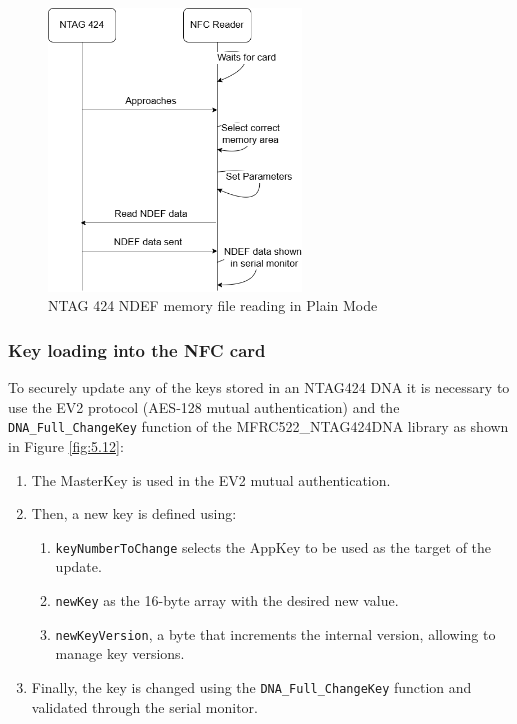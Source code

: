 \begin{figure}[htbp]
	\centering
	\includegraphics[width=0.6\textwidth]{imaxes/NDEF_READ} %
	\caption{NTAG 424 NDEF memory file reading in Plain Mode}
	\label{fig:5.11}
\end{figure}

\subsubsection{Key loading into the NFC card}
\label{subsubsection:keyload}
To securely update any of the keys stored in an NTAG424 DNA it is necessary to use the EV2 protocol (AES-128 mutual authentication) and the \texttt{DNA\_Full\_ChangeKey} function of the MFRC522\_NTAG424DNA library as shown in Figure \ref{fig:5.12}:
\begin{enumerate}
	\item The MasterKey is used in the EV2 mutual authentication.
	\item Then, a new key is defined using:
	\begin{enumerate}
		\item \texttt{keyNumberToChange} selects the AppKey to be used as the target of the update.
		\item \texttt{newKey} as the 16-byte array with the desired new value.
		\item \texttt{newKeyVersion}, a byte that increments the internal version, allowing to manage key versions.
	\end{enumerate}
	\item Finally, the key is changed using the \texttt{DNA\_Full\_ChangeKey} function and validated through the serial monitor.
\end{enumerate}

